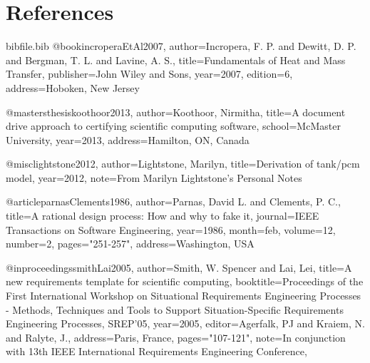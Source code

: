 \documentclass[12pt]{article}
\begin{document}
\section{References}
\label{Sec:References}
\begin{filecontents*}{bibfile.bib}
@book{incroperaEtAl2007,
author={Incropera, F. P. and Dewitt, D. P. and Bergman, T. L. and Lavine, A. S.},
title={Fundamentals of Heat and Mass Transfer},
publisher={John Wiley and Sons},
year={2007},
edition={6},
address={Hoboken, New Jersey}}

@mastersthesis{koothoor2013,
author={Koothoor, Nirmitha},
title={A document drive approach to certifying scientific computing software},
school={McMaster University},
year={2013},
address={Hamilton, ON, Canada}}

@misc{lightstone2012,
author={Lightstone, Marilyn},
title={Derivation of tank/pcm model},
year={2012},
note={From Marilyn Lightstone's Personal Notes}}

@article{parnasClements1986,
author={Parnas, David L. and Clements, P. C.},
title={A rational design process: How and why to fake it},
journal={IEEE Transactions on Software Engineering},
year={1986},
month=feb,
volume={12},
number={2},
pages={"251-257"},
address={Washington, USA}}

@inproceedings{smithLai2005,
author={Smith, W. Spencer and Lai, Lei},
title={A new requirements template for scientific computing},
booktitle={Proceedings of the First International Workshop on Situational Requirements Engineering Processes - Methods, Techniques and Tools to Support Situation-Specific Requirements Engineering Processes, SREP'05},
year={2005},
editor={Agerfalk, PJ and Kraiem, N. and Ralyte, J.},
address={Paris, France},
pages={"107-121"},
note={In conjunction with 13th IEEE International Requirements Engineering Conference,}}
\end{filecontents*}
\nocite{*}
\printbibliography[heading=none]
\end{document}
